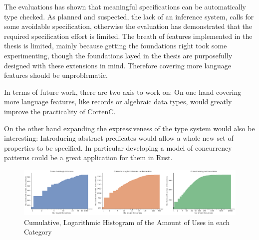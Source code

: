 \documentclass[twoside, english]{sdqthesis}
\theoremstyle{definition}
\begin{document}
The evaluations has shown that meaningful specifications can be automatically type checked. 
As planned and suspected, the lack of an inference system, calls for some avoidable specification, otherwise the evaluation has demonstrated that the required specification effort is limited.
The breath of features implemented in the thesis is limited, mainly because getting the foundations right took some experimenting, though the foundations layed in the thesis are purposefully designed with these extensions in mind. Therefore covering more language features should be unproblematic.


In terms of future work, there are two axis to work on: 
On one hand covering more language features, like records or algebraic data types, would greatly improve the practicality of CortenC. 

On the other hand expanding the expressiveness of the type system would also be interesting: Introducing abstract predicates would allow a whole new set of properties to be specified. In particular developing a model of concurrency patterns could be a great application for them in Rust.

\fi



\printbibliography[heading=bibintoc]

\appendix


\begin{figure}[h]
	\centering
	\includegraphics[width=0.99\linewidth, clip, trim={0.2cm 0.2cm 0.2cm 0.2cm}]{../unsafe-occurences-vs-no-crates.pdf}
	\caption{Cumulative, Logarithmic Histogram of the Amount of  Uses in each Category}
	\label{fig:unsafe-hist}
\end{figure}
\end{document}
